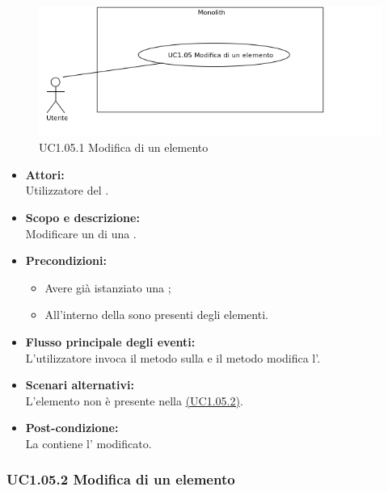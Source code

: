 \begin{figure}[H]
	\centering
	\includegraphics[width=15cm]{../../documenti/AnalisiDeiRequisiti/Diagrammi_img/uc1_05.png}
	\caption{UC1.05.1 Modifica di un elemento}
\end{figure}

\begin{itemize}
	\item \textbf{Attori:}
	\\Utilizzatore del .
	\item \textbf{Scopo e descrizione:} 
	\\Modificare un  di una .
	\item \textbf{Precondizioni:}
	\begin{itemize}
		\item Avere già istanziato una ;
		\item All'interno della  sono presenti degli elementi.
	\end{itemize}
	\item \textbf{Flusso principale degli eventi:}
	\\L'utilizzatore invoca il metodo sulla  e il metodo modifica l'.
	\item \textbf{Scenari alternativi:}
	\\L'elemento non è presente nella  \hyperref[UC1.05.2]{(UC1.05.2)}.
	\item \textbf{Post-condizione:}
	\\La {} contiene l' modificato.
\end{itemize}

\subsubsection{UC1.05.2 Modifica di un elemento} \label{UC1.05.2}

